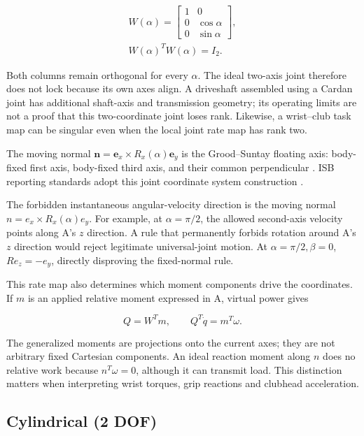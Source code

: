 \[
\begin{gathered}W(\alpha)=\begin{bmatrix}1&0\\0&\cos\alpha\\0&\sin\alpha\end{bmatrix},\\ W(\alpha)^T W(\alpha)=I_2.\end{gathered}
\]

Both columns remain orthogonal for every \(\alpha\). The ideal two-axis joint therefore does not lock because its own axes align. A driveshaft assembled using a Cardan joint has additional shaft-axis and transmission geometry; its operating limits are not a proof that this two-coordinate joint loses rank. Likewise, a wrist--club task map can be singular even when the local joint rate map has rank two.

The moving normal \(\mathbf n=\mathbf e_x\times R_x(\alpha)\mathbf e_y\) is the Grood--Suntay floating axis: body-fixed first axis, body-fixed third axis, and their common perpendicular \citep{Grood1983}. ISB reporting standards adopt this joint coordinate system construction \citep{Wu2002,Wu2005}.

The forbidden instantaneous angular-velocity direction is the moving normal \(n=e_x\times R_x(\alpha)e_y\). For example, at \(\alpha=\pi/2\), the allowed second-axis velocity points along A's \(z\) direction. A rule that permanently forbids rotation around A's \(z\) direction would reject legitimate universal-joint motion. At \(\alpha=\pi/2,\beta=0\), \(R e_z=-e_y\), directly disproving the fixed-normal rule.

This rate map also determines which moment components drive the coordinates. If \(m\) is an applied relative moment expressed in A, virtual power gives

\[
Q=W^T m,\qquad Q^T\dot q=m^T\omega.
\]

The generalized moments are projections onto the current axes; they are not arbitrary fixed Cartesian components. An ideal reaction moment along \(n\) does no relative work because \(n^T\omega=0\), although it can transmit load. This distinction matters when interpreting wrist torques, grip reactions and clubhead acceleration.

\subsection{Cylindrical (2 DOF)}\label{cylindrical-2-dof}

